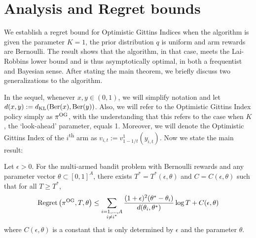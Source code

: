 \section{Analysis and Regret bounds} \label{sec:analysis_of_regret}
We establish a regret bound for Optimistic Gittins Indices when the algorithm is given the parameter $K = 1$, the prior distribution $q$ is uniform and arm rewards are Bernoulli. The result shows that the algorithm, in that case, meets the Lai-Robbins lower bound and is thus asymptotically optimal, in both a frequentist and Bayesian sense. After stating the main theorem, we briefly discuss two generalizations to the algorithm.

In the sequel, whenever $x,y \in (0,1)$, we will simplify notation  and let $d(x,y) := d_{\rm KL}(\text{Ber}(x),\text{Ber}(y))$. Also, we will refer to the Optimistic Gittins Index policy simply as $\pi^{\rm OG}$, with the understanding that this refers to the case when $K$, the `look-ahead' parameter, equals 1. Moreover, we will denote the Optimistic Gittins Index of the $i$\textsuperscript{th} arm as $v_{i,t} := v^1_{1-1/t}(y_{i,t})$. Now we state the main result:
\begin{theorem} \label{thm:frequentist_optimal_bound}
	Let $\epsilon > 0$. For the multi-armed bandit problem with Bernoulli rewards and any parameter vector $\theta \subset [0,1]^A$, there exists $T^* = T^*(\epsilon, \theta)$ and $C = C(\epsilon,\theta)$ such that for all $T \ge T^*$,
	\begin{equation}
	\textnormal{Regret} \left( \pi^{\rm OG}, T, \theta \right) \le \sum_{\substack{i=1,\ldots,A \\ i \ne i^*}} \frac{(1+\epsilon)^2(\theta^* - \theta_i)}{d(\theta_i, \theta^*)} \log T  + C(\epsilon,\theta)
	\end{equation}
	where $C(\epsilon,\theta)$ is a constant that is only determined by $\epsilon$ and the parameter $\theta$.
\end{theorem}
